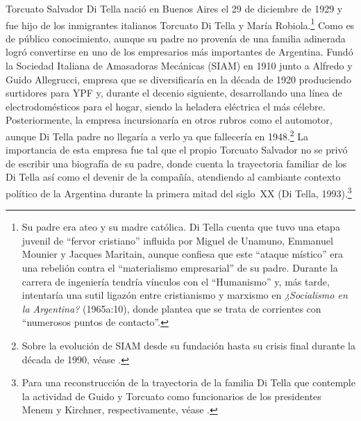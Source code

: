Torcuato Salvador Di Tella nació en Buenos Aires el 29 de diciembre de 1929 y fue hijo de los inmigrantes italianos Torcuato Di Tella y María Robiola.\footnote{Su padre era ateo y su madre católica. Di Tella cuenta que tuvo una etapa juvenil de \enquote{fervor cristiano} \parencite[264]{1553-CAMOU2009} influida por Miguel de Unamuno, Emmanuel Mounier y Jacques Maritain, aunque confiesa que este \enquote{ataque místico} era una rebelión contra el \enquote{materialismo empresarial} de su padre. Durante la carrera de ingeniería tendría vínculos con el \enquote{Humanismo} y, más tarde, intentaría una sutil ligazón entre cristianismo y marxismo en \emph{¿Socialismo en la Argentina?} (1965a:10), donde plantea que se trata de corrientes con \enquote{numerosos puntos de contacto}.} Como es de público conocimiento, aunque su padre no provenía de una familia adinerada logró convertirse en uno de los empresarios más importantes de Argentina. Fundó la Sociedad Italiana de Amasadoras Mecánicas (SIAM) en 1910 junto a Alfredo y Guido Allegrucci, empresa que se diversificaría en la década de 1920 produciendo surtidores para YPF y, durante el decenio siguiente, desarrollando una línea de electrodomésticos para el hogar, siendo la heladera eléctrica el más célebre. Posteriormente, la empresa incursionaría en otros rubros como el automotor, aunque Di Tella padre no llegaría a verlo ya que fallecería en 1948.\footnote{Sobre la evolución de SIAM desde su fundación hasta su crisis final durante la década de 1990, véase \textcite{1583-COCHRAN2016}.} La importancia de esta empresa fue tal que el propio Torcuato Salvador no se privó de escribir una biografía de su padre, donde cuenta la trayectoria familiar de los Di Tella así como el devenir de la compañía, atendiendo al cambiante contexto político de la Argentina durante la primera mitad del siglo~XX (Di Tella, 1993).\footnote{Para una reconstrucción de la trayectoria de la familia Di Tella que contemple la actividad de Guido y Torcuato como funcionarios de los presidentes Menem y Kirchner, respectivamente, véase \textcite{1448-CASSESE2008}.}

